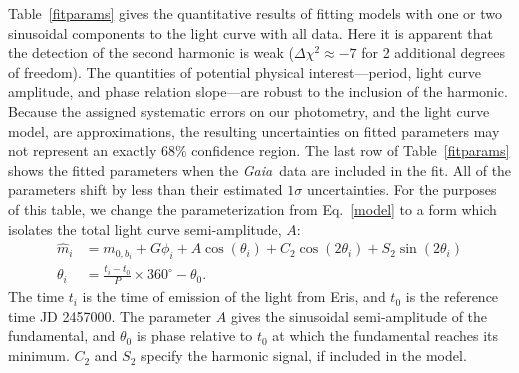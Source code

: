 \documentclass[onecolumn]{aastex631}
\newcommand{\gaia}{\textit{Gaia}}
\begin{document}
Table~\ref{fitparams} gives the quantitative results of fitting models with one or two sinusoidal components to the light curve with all data.   Here it is apparent that the detection of the second harmonic is weak ($\Delta \chi^2\approx -7$ for 2 additional degrees of freedom).  The quantities of potential physical interest---period, light curve amplitude, and phase relation slope---are robust to the inclusion of the harmonic.  Because the assigned systematic errors on our photometry, and the light curve model, are approximations, the resulting uncertainties on fitted parameters may not represent an exactly 68\% confidence region.
The last row of Table~\ref{fitparams} shows the fitted parameters when the \gaia\ data are included in the fit.  All of the parameters shift by less than their estimated $1\sigma$ uncertainties.  For the purposes of this table, we change the parameterization from Eq.~\ref{model} to a form which isolates the total light curve semi-amplitude, $A$:
\begin{align}
  \hat m_i & = m_{0,b_i} + G\phi_i + A\cos(\theta_i) + C_2 \cos(2\theta_i) + S_2\sin(2 \theta_i) \nonumber \\
  \theta_i & = \frac{t_i - t_0}{P} \times 360^\circ - \theta_0.
             \label{newmodel}
\end{align}
The time $t_i$ is the time of emission of the light from Eris, and $t_0$ is the reference time JD 2457000.  The parameter $A$ gives the sinusoidal semi-amplitude of the fundamental, and $\theta_0$ is phase relative to $t_0$ at which the fundamental reaches its minimum.  $C_2$ and $S_2$ specify the harmonic signal, if included in the model.
\end{document}
